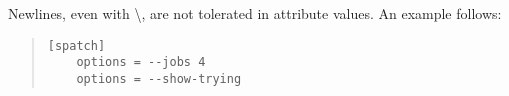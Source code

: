 Newlines, even with \textbackslash, are not tolerated in attribute values. An example
follows:

\begin{quote}
\begin{verbatim}
[spatch]
	options = --jobs 4
	options = --show-trying
\end{verbatim}
\end{quote}

